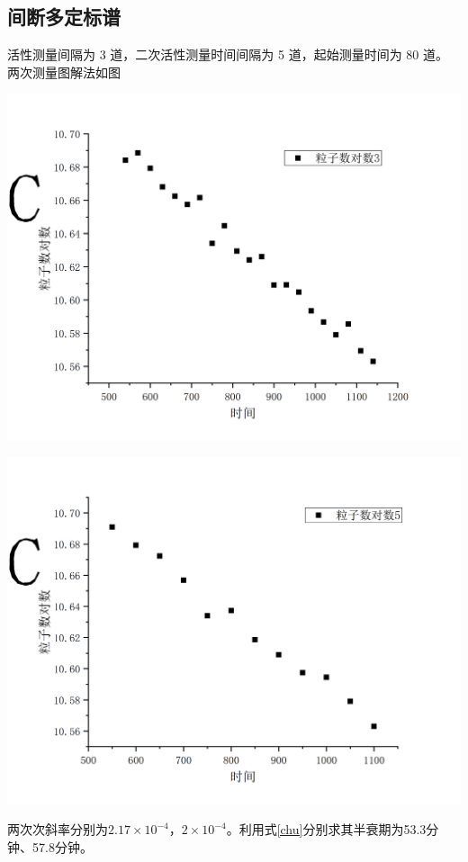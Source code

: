 \documentclass[hyperref]{ctexart}
\begin{document}
\begin{multicols}{2}
	\subsection{间断多定标谱}
	活性测量间隔为 3 道，二次活性测量时间间隔为 5 道，起始测量时间为 80 道。
	两次测量图解法如图
	\begin{center}\includegraphics[scale=0.3]{t41}\end{center}
	\begin{center}\includegraphics[scale=0.3]{t43}\end{center}
	两次次斜率分别为$2.17 \times 10^{-4}$，$2 \times 10^{-4}$。利用式\eqref{chu}分别求其半衰期为53.3分钟、57.8分钟。


\end{multicols}
\end{document}

